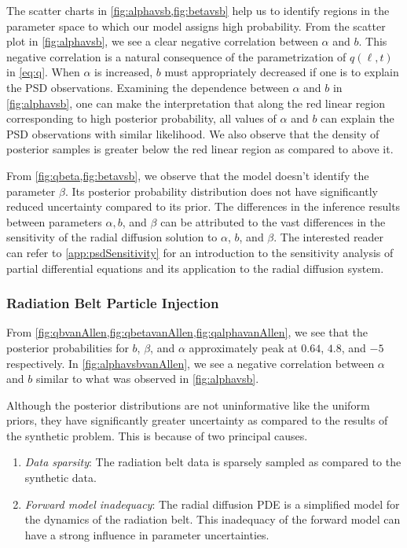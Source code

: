 The scatter charts in \cref{fig:alphavsb,fig:betavsb} help us to identify regions in the 
parameter space to which our model assigns high probability. From the scatter plot in 
\cref{fig:alphavsb}, we see a clear negative correlation between $\alpha$ and $b$. This negative 
correlation is a natural consequence of the parametrization of $q(\ell, t)$ in \cref{eq:q}. When 
$\alpha$ is increased, $b$ must appropriately decreased if one is to explain the PSD observations. 
Examining the dependence between $\alpha$ and $b$ in \cref{fig:alphavsb}, one can make the 
interpretation that along the red linear region corresponding to high posterior probability, all 
values of $\alpha$ and $b$ can explain the PSD observations with similar likelihood. We also 
observe that the density of posterior samples is greater below the red linear region as compared to 
above it.

From \cref{fig:qbeta,fig:betavsb}, we observe that the model doesn't identify the parameter 
$\beta$. Its posterior probability distribution does not have significantly reduced uncertainty 
compared to its prior. The differences in the inference results between parameters $\alpha, b$, and 
$\beta$ can be attributed to the vast differences in the sensitivity of the radial diffusion 
solution to $\alpha$, $b$, and $\beta$. The interested reader can refer to 
\cref{app:psdSensitivity} for an introduction to the sensitivity analysis of partial differential 
equations and its application to the radial diffusion system.     

\subsubsection*{Radiation Belt Particle Injection}

From \cref{fig:qbvanAllen,fig:qbetavanAllen,fig:qalphavanAllen}, we see that the posterior 
probabilities for $b$, $\beta$, and $\alpha$ approximately peak at $0.64$, $4.8$, and $-5$ 
respectively. In \cref{fig:alphavsbvanAllen}, we see a negative correlation between $\alpha$ and 
$b$ similar to what was observed in \cref{fig:alphavsb}.

Although the posterior distributions are not uninformative like the uniform priors, they have 
significantly greater uncertainty as compared to the results of the synthetic problem. This is 
because of two principal causes.
\begin{enumerate}
  \item \emph{Data sparsity}: The radiation belt data is sparsely sampled as compared to the 
        synthetic data.
  \item \emph{Forward model inadequacy}: The radial diffusion PDE is a simplified model for the 
        dynamics of the radiation belt. This inadequacy of the forward model can have a strong 
        influence in parameter uncertainties. 
\end{enumerate}


